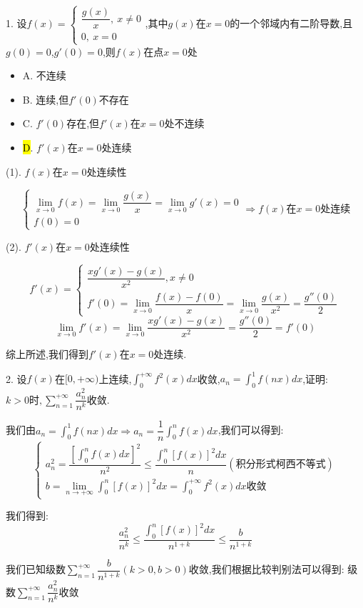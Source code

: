 1. 设$f(x)=\left\lbrace
\begin{array}{l}
	\dfrac{g(x)}{x},\ x\neq 0\\
	0,\ x=0
\end{array}
\right. $,其中$g(x)$在$x=0$的一个邻域内有二阶导数,且$g(0)=0$,$g'(0)=0$,则$f(x)$在点$x=0$处
\begin{itemize}
	\item A. 不连续
	\item B. 连续,但$f'(0)$不存在
	\item C. $f'(0)$存在,但$f'(x)$在$x=0$处不连续
	\item \hl{D}. $f'(x)$在$x=0$处连续
\end{itemize}
\begin{solution}

	(1). $f(x)$在$x=0$处连续性
	
	$$\left\lbrace
	\begin{array}{l}
		\lim\limits_{x\rightarrow 0}f(x)=\lim\limits_{x\rightarrow 0}\dfrac{g(x)}{x}=\lim\limits_{x\rightarrow 0}g'(x)=0\\
		f(0)=0
	\end{array}
	\right. \Rightarrow f(x)\text{在}x=0\text{处连续}$$
	
	(2). $f'(x)$在$x=0$处连续性
	
	$$f'(x)=\left\lbrace
	\begin{array}{l}
		\dfrac{xg'(x)-g(x)}{x^2},x\neq 0\\
		f'(0)=\lim\limits_{x\rightarrow 0}\dfrac{f(x)-f(0)}{x}=\lim\limits_{x\rightarrow 0}\dfrac{g(x)}{x^2}=\dfrac{g''(0)}{2}
	\end{array}
	\right.$$
	$$\lim\limits_{x\rightarrow 0}f'(x)=\lim\limits_{x\rightarrow 0}\dfrac{xg'(x)-g(x)}{x^2}=\dfrac{g''(0)}{2}=f'(0)$$
	
	综上所述,我们得到$f'(x)$在$x=0$处连续.
\end{solution}

2. 设$f(x)$在$[0,+\infty)$上连续,$\int_{0}^{+\infty}f^{2}(x)dx$收敛,$a_{n}=\int_{0}^{1}f(nx)dx$,证明:  $k>0\text{时},\sum\limits_{n=1}^{+\infty}\dfrac{a_{n}^2}{n^k}$收敛.
\begin{solution}

	我们由$a_{n}=\int_{0}^{1}f(nx)dx\Rightarrow a_{n}=\dfrac{1}{n}\int_{0}^{n}f(x)dx$,我们可以得到:  
	$$\left\lbrace
	\begin{array}{l}
		a_{n}^2=\dfrac{[\int_{0}^{n}f(x)dx]^2}{n^2}\leq \dfrac{\int_{0}^{n}[f(x)]^2dx}{n}(\text{积分形式柯西不等式})\\
		b=\lim\limits_{n\rightarrow+\infty}\int_{0}^{n}[f(x)]^2dx=\int_{0}^{+\infty}f^{2}(x)dx\text{收敛}
	\end{array}
	\right. $$
	
	我们得到:  $$\dfrac{a_{n}^2}{n^{k}}\leq \dfrac{\int_{0}^{n}[f(x)]^2dx}{n^{1+k}}\leq \dfrac{b}{n^{1+k}}$$
	
	我们已知级数$\sum\limits_{n=1}^{+\infty}\dfrac{b}{n^{1+k}}(k>0,b>0)$收敛,我们根据比较判别法可以得到:  级数$\sum\limits_{n=1}^{+\infty}\dfrac{a_{n}^2}{n^k}$收敛
\end{solution}

